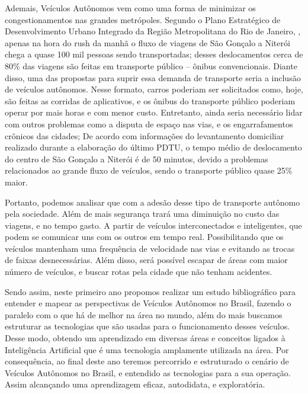 \documentclass{article}
\begin{document}
Ademais, Veículos Autônomos vem como uma forma de minimizar os congestionamentos nas grandes metrópoles. Segundo o  Plano Estratégico de Desenvolvimento Urbano Integrado da Região Metropolitana do Rio de Janeiro, \cite{rj_transito}, apenas na hora do rush da manhã o fluxo de viagens de São Gonçalo a Niterói chega a quase 100 mil pessoas sendo transportadas; desses deslocamentos cerca de 80\% das viagens são feitas em transporte público – ônibus convencionais. Diante disso, uma das propostas para suprir essa demanda de transporte seria a inclusão de veículos autônomos. Nesse formato, carros poderiam ser solicitados como, hoje, são feitas as corridas de aplicativos, e os ônibus do transporte público  poderiam operar por mais horas e com menor custo. 
Entretanto, ainda seria necessário lidar com outros problemas como a disputa de espaço nas vias, e os engarrafamentos crônicos das cidades; De acordo com informações do levantamento domiciliar realizado durante a elaboração do último PDTU, o tempo médio de deslocamento do centro de São Gonçalo a Niterói é de 50 minutos, devido a problemas relacionados ao grande fluxo de veículos, sendo o transporte público quase 25\% maior.

Portanto, podemos analisar que com a adesão desse tipo de transporte autônomo pela sociedade. Além de mais segurança trará uma diminuição no custo das viagens, e no tempo gasto. A partir de veículos interconectados e inteligentes, que podem se comunicar uns com os outros em tempo real. Possibilitando que os veículos  mantenham uma frequência de velocidade nas vias e evitando as trocas de faixas desnecessárias. Além disso, será possível escapar de áreas com maior número de veículos, e buscar rotas pela cidade que não tenham acidentes.


Sendo assim, neste primeiro ano propomos realizar um estudo bibliográfico para entender e mapear as perspectivas de Veículos Autônomos no Brasil, fazendo o paralelo com o que há de melhor na área no mundo, além do mais buscamos estruturar as tecnologias que são usadas para o funcionamento desses veículos. Desse modo, obtendo um aprendizado em diversas áreas e conceitos ligados à Inteligência Artificial que é uma tecnologia amplamente utilizada na área.
Por consequência, ao final deste ano teremos percorrido e estruturado o cenário de Veículos Autônomos no Brasil, e entendido as tecnologias para a sua operação. Assim alcançando uma aprendizagem eficaz, autodidata, e exploratória.



 
\end{document}

